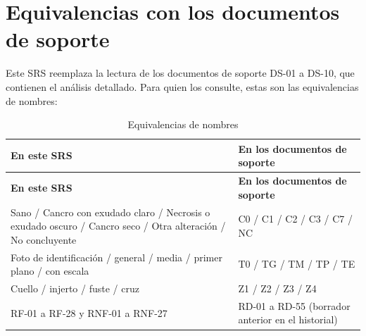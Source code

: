\documentclass[11pt]{article}
\begin{document}
\section{Equivalencias con los documentos de soporte}
Este SRS reemplaza la lectura de los documentos de soporte DS-01 a DS-10, que contienen el análisis detallado. Para quien los consulte, estas son las equivalencias de nombres:

{\small
\begin{longtable}{|>{\RaggedRight\arraybackslash}p{8.41cm}|>{\RaggedRight\arraybackslash}p{6.45cm}|}
\caption{Equivalencias de nombres}\\
\hline
\rowcolor{encabezado}\textbf{En este SRS} & \textbf{En los documentos de soporte} \\ \hline
\endfirsthead
\hline
\rowcolor{encabezado}\textbf{En este SRS} & \textbf{En los documentos de soporte} \\ \hline
\endhead
Sano / Cancro con exudado claro / Necrosis o exudado oscuro / Cancro seco / Otra alteración / No concluyente & C0 / C1 / C2 / C3 / C7 / NC \\ \hline
Foto de identificación / general / media / primer plano / con escala & T0 / TG / TM / TP / TE \\ \hline
Cuello / injerto / fuste / cruz & Z1 / Z2 / Z3 / Z4 \\ \hline
RF-01 a RF-28 y RNF-01 a RNF-27 & RD-01 a RD-55 (borrador anterior en el historial) \\ \hline
\end{longtable}}
\end{document}
